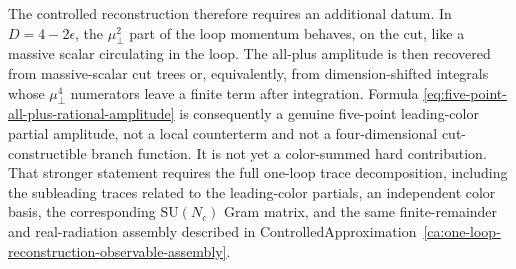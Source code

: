 \begin{controlledapproximation}
The controlled reconstruction therefore requires an additional datum.  In
\(D=4-2\epsilon\), the \(\mu_\perp^2\) part of the loop momentum behaves, on
the cut, like a massive scalar circulating in the loop.  The all-plus
amplitude is then recovered from massive-scalar cut trees or, equivalently,
from dimension-shifted integrals whose \(\mu_\perp^4\) numerators leave a
finite term after integration.  Formula
\eqref{eq:five-point-all-plus-rational-amplitude} is consequently a genuine
five-point leading-color partial amplitude, not a local counterterm and not a
four-dimensional cut-constructible branch function.  It is not yet a
color-summed hard contribution.  That stronger statement requires the full
one-loop trace decomposition, including the subleading traces related to the
leading-color partials, an independent color basis, the corresponding
\(\mathrm{SU}(N_c)\) Gram matrix, and the same finite-remainder and
real-radiation assembly described in
ControlledApproximation~\ref{ca:one-loop-reconstruction-observable-assembly}.
\end{controlledapproximation}

